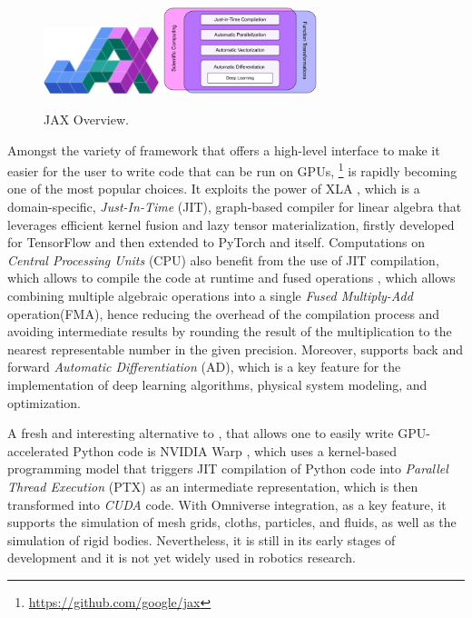 \begin{figure}[h]
    \centering
    \caption{JAX Overview.}
    \label{fig:jax_logo}
    \includegraphics[width=0.3\textwidth]{Images/jax_logo.png} \qquad \qquad
    \includegraphics[width=0.4\textwidth]{Images/JAX-overview.png}
\end{figure}

Amongst the variety of framework that offers a high-level interface to make it easier for the user to write code that can be run on \ac{GPU}s, \jax \footnote{\url{https://github.com/google/jax}} \citep{bradbury_jax_2018,47008} is rapidly becoming one of the most popular choices. It exploits the power of \ac{XLA} \citep{50530}, which is a domain-specific, \textit{Just-In-Time} (\ac{JIT}), graph-based compiler for linear algebra that leverages efficient kernel fusion and lazy tensor materialization, firstly developed for TensorFlow \citep{tensorflow2015-whitepaper} and then extended to PyTorch and \jax itself.
Computations on \textit{Central Processing Units} (\ac{CPU}) also benefit from the use of \ac{JIT} compilation, which allows to compile the code at runtime and fused operations \citep{wang_kernel_2010,snider_operator_2023}, which allows combining multiple algebraic operations into a single \textit{Fused Multiply-Add} operation(\ac{FMA}), hence reducing the overhead of the compilation process and avoiding intermediate results by rounding the result of the multiplication to the nearest representable number in the given precision.
Moreover, \jax supports back and forward \textit{Automatic Differentiation} (\ac{AD}), which is a key feature for the implementation of deep learning algorithms, physical system modeling, and optimization.

A fresh and interesting alternative to \jax, that allows one to easily write \ac{GPU}-accelerated Python code is NVIDIA Warp \citep{warp2022}, which uses a kernel-based programming model that triggers \ac{JIT} compilation of Python code into \textit{Parallel Thread Execution} (\ac{PTX}) as an intermediate representation, which is then transformed into \textit{CUDA} code. With Omniverse integration, as a key feature, it supports the simulation of mesh grids, cloths, particles, and fluids, as well as the simulation of rigid bodies. Nevertheless, it is still in its early stages of development and it is not yet widely used in robotics research.



